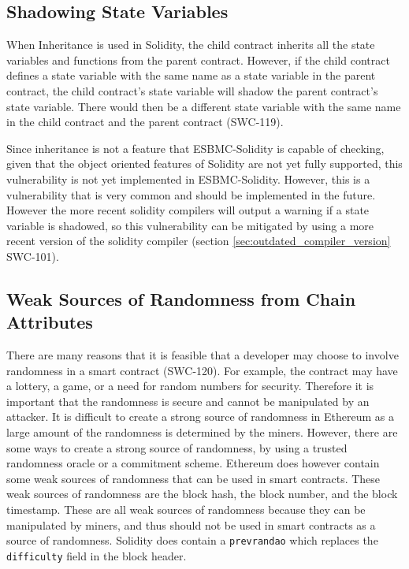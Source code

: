\subsection{Shadowing State Variables}
\label{sec:shadowing_state_variables}

When Inheritance is used in Solidity, the child contract inherits all the state variables and functions from the parent contract. However, if the child contract defines a state variable with the same name as a state variable in the parent contract, the child contract's state variable will shadow the parent contract's state variable. There would then be a different state variable with the same name in the child contract and the parent contract (SWC-119). 

Since inheritance is not a feature that ESBMC-Solidity is capable of checking, given that the object oriented features of Solidity are not yet fully supported, this vulnerability is not yet implemented in ESBMC-Solidity. However, this is a vulnerability that is very common and should be implemented in the future. However the more recent solidity compilers will output a warning if a state variable is shadowed, so this vulnerability can be mitigated by using a more recent version of the solidity compiler (section \ref{sec:outdated_compiler_version} SWC-101).

\subsection{Weak Sources of Randomness from Chain Attributes}
\label{sec:weak_sources_of_randomness_from_chain_attributes}

There are many reasons that it is feasible that a developer may choose to involve randomness in a smart contract (SWC-120). For example, the contract may have a lottery, a game, or a need for random numbers for security. Therefore it is important that the randomness is secure and cannot be manipulated by an attacker. It is difficult to create a strong source of randomness in Ethereum as a large amount of the randomness is determined by the miners. However, there are some ways to create a strong source of randomness, by using a trusted randomness oracle \cite{allemann2021randomness} or a commitment scheme. Ethereum does however contain some weak sources of randomness that can be used in smart contracts. These weak sources of randomness are the block hash, the block number, and the block timestamp. These are all weak sources of randomness because they can be manipulated by miners, and thus should not be used in smart contracts as a source of randomness. Solidity does contain a \verb|prevrandao| which replaces the \verb|difficulty| field in the block header.

